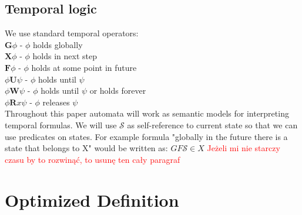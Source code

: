 \documentclass[12pt]{article}
\begin{document}
\subsection{Temporal logic}
We use standard temporal operators: \\
$\mathbf{G}\phi$ - $\phi$ holds globally \\
$\mathbf{X}\phi$ - $\phi$ holds in next step \\
$\mathbf{F}\phi$ - $\phi$ holds at some point in future \\
$\phi \mathbf{U}\psi$ - $\phi$ holds until $\psi$ \\
$\phi \mathbf{W}\psi$ - $\phi$ holds until $\psi$ or holds forever \\
$\phi \mathbf{R}x \psi$ - $\phi$ releases $\psi$ \\
Throughout this paper automata will work as semantic models for interpreting temporal formulas. We will use $\mathcal{S}$ as self-reference to current state so that we can use predicates on states. For example formula "globally in the future there is a state that belongs to X" would be written as:
$GF\mathcal{S}\in X$
\textcolor{red}{Jeżeli mi nie starczy czasu by to rozwinąć, to usunę ten cały paragraf}

\section{Optimized Definition}
\end{document}
